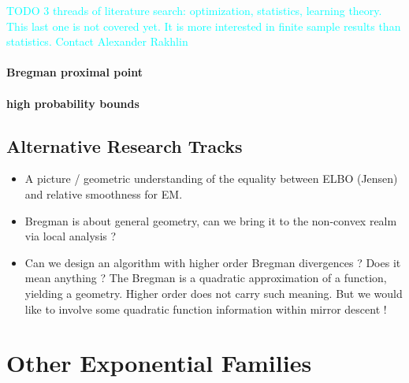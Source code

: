 \documentclass{article}
\newcommand{\TODO}[1]{\textcolor{cyan}{TODO #1}}
\begin{document}
\TODO{3 threads of literature search: optimization, statistics, learning theory. This last one is not covered yet. It is more interested in finite sample results than statistics. Contact Alexander Rakhlin}

\paragraph{Bregman proximal point}

\paragraph{high probability bounds}


\subsection{Alternative Research Tracks}
\begin{itemize}
	\item A picture / geometric understanding of the equality between ELBO (Jensen) and relative smoothness for EM.
	\item Bregman is about general geometry, can we bring it to the non-convex realm via local analysis ?
	\item Can we design an algorithm with higher order Bregman divergences ? Does it mean anything ? The Bregman is a quadratic approximation of a function, yielding a geometry. Higher order does not carry such meaning. But we would like to involve some quadratic function information within mirror descent !
\end{itemize}







\newpage
\appendix

\section{Other Exponential Families}
\label{app:expfamily}
\end{document}
